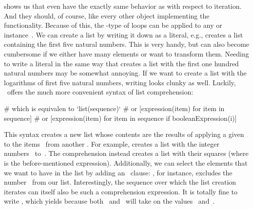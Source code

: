  shows us that even  have the exactly same behavior as  with respect to iteration.
And they should, of course, like every other object implementing the~ functionality.
Because of this, the -type of loops can be applied to any  or  instance~.%
%
\endhsection%
%
%
%
We can create a list by writing it down as a literal, e.g., \pythonil{[1, 2, 3, 4, 5]} creates a list containing the first five natural numbers.
This is very handy, but can also become cumbersome if we either have many elements or want to transform them.
Needing to write a literal in the same way that creates a list with the first one hundred natural numbers may be somewhat annoying.
If we want to create a list with the logarithms of first five natural numbers, writing  looks clunky as well.
Luckily, \python\ offers the much more convenient syntax of list comprehension:%
%
\begin{pythonSyntax}
  # which is equivalen to `list(sequence)`
# or
[expression(item) for item in sequence]
# or
[expression(item) for item in sequence if booleanExpression(i)]
\end{pythonSyntax}
%
%
%
%
%
\begin{sloppypar}%
This syntax creates a new list whose contents are the results of applying a given  to the items~ from another .
For example,  creates a list with the integer numbers~ to~.
The comprehension  instead creates a list with their squares (where  is the before-mentioned expression).
Additionally, we can select the elements that we want to have in the list by adding an ~clause:
\pythonil{[i for i in range(10) if i != 3]}, for instance, excludes the number~ from our list.
Interestingly, the sequence over which the list creation iterates can itself also be such a comprehension expression.
It is totally fine to write , which yields \pythonil{[0, 0, 0, 1]} because both~ and~ will take on the values~ and~.%
\end{sloppypar}%
